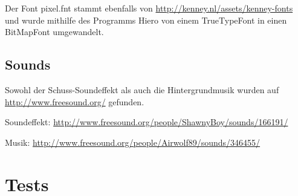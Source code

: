 \documentclass[10pt]{report}
\begin{document}
Der Font pixel.fnt stammt ebenfalls von \url{http://kenney.nl/assets/kenney-fonts} und wurde mithilfe des Programms Hiero von einem TrueTypeFont in einen BitMapFont umgewandelt.

\subsection{Sounds}
Sowohl der Schuss-Soundeffekt als auch die Hintergrundmusik wurden auf \url{http://www.freesound.org/} gefunden.

Soundeffekt: \url{http://www.freesound.org/people/ShawnyBoy/sounds/166191/}

Musik: \url{http://www.freesound.org/people/Airwolf89/sounds/346455/}

\newpage
\section{Tests}
\end{document}
